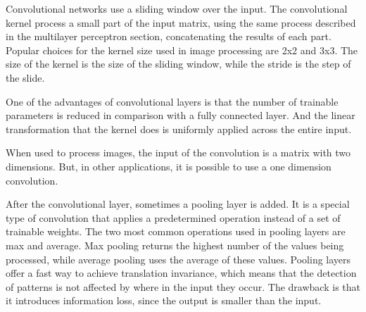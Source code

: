 Convolutional networks \cite{lecun_backpropagation_1989} \cite{lecun_convolutional_1995} use a sliding window over the input. The convolutional kernel process a small part of the input matrix, using the same process described in the multilayer perceptron section, concatenating the results of each part. Popular choices for the kernel size used in image processing are 2x2 and 3x3. The size of the kernel is the size of the sliding window, while the stride  is the step of the slide.

One of the advantages of convolutional layers is that the number of trainable parameters is reduced in comparison with a fully connected layer. And the linear transformation that the kernel does is uniformly applied across the entire input.

When used to process images, the input of the convolution is a matrix with two dimensions. But, in other applications, it is possible to use a one dimension convolution.

After the convolutional layer, sometimes a pooling layer is added. It is a special type of convolution that applies a predetermined operation instead of a set of trainable weights. The two most common operations used in pooling layers are max and average. Max pooling returns the highest number of the values being processed, while average pooling uses the average of these values. Pooling layers offer a fast way to achieve translation invariance, which means that the detection of patterns is not affected by where in the input they occur. The drawback is that it introduces information loss, since the output is smaller than the input.